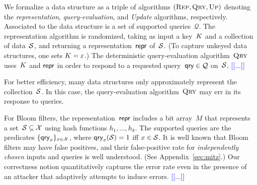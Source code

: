 %
We formalize a data structure as a triple of algorithms $(\textnormal{\textsc{Rep}}, \textnormal{\textsc{Qry}}, \textnormal{\textsc{Up}})$ denoting
the \emph{representation}, \emph{query-evaluation}, and \emph{Update} algorithms, respectively.
Associated to the data structure is a set of supported queries~$\mathcal{Q}$.
The representation algorithm is randomized, taking as input a
key~$K$ and a collection of data~$\mathcal{S}$, and returning a
representation~$\mathsf{repr}$ of~$\mathcal{S}$.  (To capture unkeyed data structures,
one sets $K=\varepsilon$.)
%
The deterministic query-evaluation algorithm~$\textnormal{\textsc{Qry}}$ uses~$K$ and $\mathsf{repr}$ in
order to respond to a requested query~$\mathsf{qry} \in \mathcal{Q}$ on~$\mathcal{S}$.
\textcolor{blue}{[[...]]}

For better efficiency, many data structures only approximately
represent the collection~$\mathcal{S}$. In this case, the query-evaluation
algorithm~$\textnormal{\textsc{Qry}}$ may err in its response to queries.  

For Bloom filters, the representation~$\mathsf{repr}$ includes a bit array~$M$ that
represents a set~$\mathcal{S} \subseteq \mathcal{X}$ using hash functions
$h_1,\ldots,h_k$. The supported queries are the predicates
$\{\mathsf{qry}_x\}_{x\in\mathcal{X}}$, where $\mathsf{qry}_x(\mathcal{S})=1$ iff $x \in \mathcal{S}$. It is well
known that Bloom filters may have false positives, and their false-positive rate
for \emph{independently chosen} inputs and queries is well understood. (See
Appendix~\ref{sec:mitz}.) Our correctness notion quantitatively captures the
error rate even in the presence of an attacker that adaptively attempts to
induce errors. \textcolor{blue}{[[...]]}

